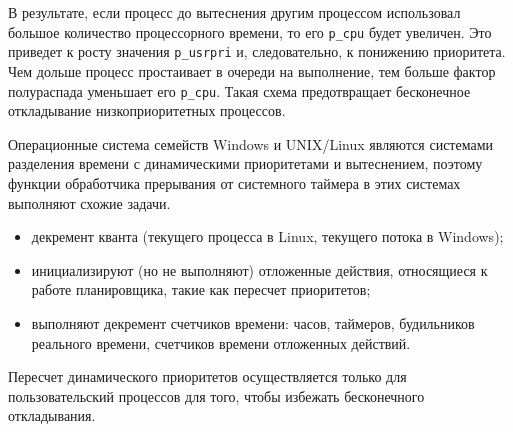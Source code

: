 В результате, если процесс до вытеснения другим процессом использовал большое количество процессорного времени, то его \texttt{p\_cpu} будет увеличен. Это приведет к росту значения \texttt{p\_usrpri} и, следовательно, к понижению приоритета. Чем дольше процесс простаивает в очереди на выполнение, тем больше фактор полураспада уменьшает его \texttt{p\_cpu}. Такая схема предотвращает бесконечное откладывание низкоприоритетных процессов. 


Операционные система семейств Windows и UNIX/Linux являются системами разделения времени с динамическими приоритетами и вытеснением, поэтому функции обработчика прерывания от системного таймера в этих системах выполняют схожие задачи.

\begin{itemize}
	\item декремент кванта (текущего процесса в Linux, текущего потока в Windows);
	\item инициализируют (но не выполняют) отложенные действия, относящиеся к работе планировщика, такие как пересчет приоритетов;
	\item выполняют декремент счетчиков времени: часов, таймеров, будильников реального времени, счетчиков времени отложенных действий.
\end{itemize}

Пересчет динамического приоритетов осуществляется только для пользовательский процессов для того, чтобы избежать бесконечного откладывания.
